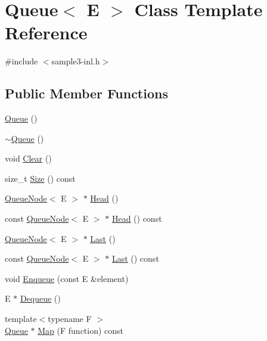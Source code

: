 \hypertarget{classQueue}{}\section{Queue$<$ E $>$ Class Template Reference}
\label{classQueue}


{\ttfamily \#include $<$sample3-\/inl.\+h$>$}

\subsection*{Public Member Functions}
\begin{DoxyCompactItemize}
\item 
\mbox{\hyperlink{classQueue_ab09891e54b51dc677ee6efb350687ae4}{Queue}} ()
\item 
\mbox{\hyperlink{classQueue_a49fe82adb8dc2fb62ab53876a6933d0f}{$\sim$\+Queue}} ()
\item 
void \mbox{\hyperlink{classQueue_acfdd5f9f7e936ca30dcf877370ef9510}{Clear}} ()
\item 
size\+\_\+t \mbox{\hyperlink{classQueue_abc4d78b5f66041011c5590bf703847b0}{Size}} () const
\item 
\mbox{\hyperlink{classQueueNode}{Queue\+Node}}$<$ E $>$ $\ast$ \mbox{\hyperlink{classQueue_a71aa0154ef75bb87a53b6af1829fcd5e}{Head}} ()
\item 
const \mbox{\hyperlink{classQueueNode}{Queue\+Node}}$<$ E $>$ $\ast$ \mbox{\hyperlink{classQueue_a6c906075e0ad2d1f0634990aa106395e}{Head}} () const
\item 
\mbox{\hyperlink{classQueueNode}{Queue\+Node}}$<$ E $>$ $\ast$ \mbox{\hyperlink{classQueue_a430aca3d3b9f5fd588b215028d134b74}{Last}} ()
\item 
const \mbox{\hyperlink{classQueueNode}{Queue\+Node}}$<$ E $>$ $\ast$ \mbox{\hyperlink{classQueue_a7c8c2c64700dfe1df8bf266572cf101a}{Last}} () const
\item 
void \mbox{\hyperlink{classQueue_abaa2e7175457307bca74f5562cbdaaa9}{Enqueue}} (const E \&element)
\item 
E $\ast$ \mbox{\hyperlink{classQueue_a434d465001c3078e999f7a89a8af84c0}{Dequeue}} ()
\item 
{\footnotesize template$<$typename F $>$ }\\\mbox{\hyperlink{classQueue}{Queue}} $\ast$ \mbox{\hyperlink{classQueue_a904a696292fc593adc6fd21fb229d760}{Map}} (F function) const
\end{DoxyCompactItemize}


